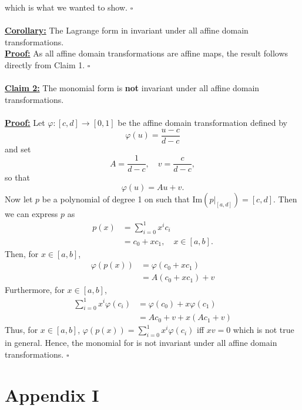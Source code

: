 \documentclass[]{article}
\begin{document}
which is what we wanted to show. $\square$\\
\\
\underline{\textbf{Corollary:}} The Lagrange form in invariant under all affine domain transformations.\\
\underline{\textbf{Proof:}} As all affine domain transformations are affine maps, the result follows directly from Claim 1. $\square$\\
\\
\underline{\textbf{Claim 2:}} The monomial form is \textbf{not} invariant under all affine domain transformations.\\
\\
\underline{\textbf{Proof:}} Let $\varphi:[c, d]\rightarrow [0, 1]$ be the affine domain transformation defined by \begin{equation*}
\varphi(u) = \frac{u - c}{d - c}
\end{equation*} 
and set \begin{equation*}
A=\frac{1}{d-c}, \quad v = \frac{c}{d - c},
\end{equation*}
so that \begin{equation*}
\varphi(u) = Au + v.
\end{equation*}
Now let $p$ be a polynomial of degree 1 on such that $\mathrm{Im}(p|_{[a, d]}) = [c, d]$. Then we can express $p$ as \begin{equation*}
\begin{aligned}
p(x) &= \sum_{i=0}^{1}x^ic_i\\
&=c_0 + xc_1, \quad x\in [a, b].
\end{aligned}
\end{equation*}
Then, for $x\in [a, b]$, \begin{equation*}
\begin{aligned}
\varphi(p(x)) &= \varphi(c_0 + xc_1)\\
&=A(c_0 + xc_1) + v
\end{aligned}
\end{equation*}
Furthermore, for $x\in [a, b]$, \begin{equation*}
\begin{aligned}
\sum_{i=0}^{1} x^i\varphi(c_i) &= \varphi(c_0) + x\varphi(c_1)\\
&=Ac_0 + v + x(Ac_1 + v)
\end{aligned}
\end{equation*}
Thus, for $x\in[a, b]$, $\varphi(p(x)) = \sum_{i = 0}^{1}x^i\varphi(c_i)$ iff $xv = 0$ which is not true in general. Hence, the monomial for is not invariant under all affine domain transformations. $\square$

\newpage
\section*{Appendix I}
%
\end{document}
